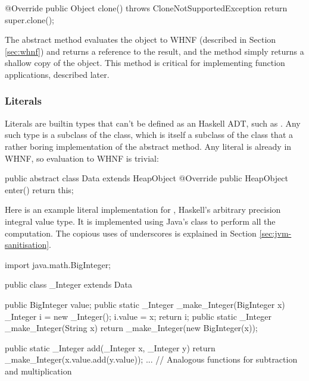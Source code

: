 \documentclass[dissertation.tex]{subfiles}
\begin{document}
{{\begin{javafigure}
{            @Override
            public Object clone() throws CloneNotSupportedException {
                return super.clone();
            }
        }
        \end{javafigure}

        The abstract  method evaluates the object to WHNF (described in Section \ref{sec:whnf}) and returns a reference to the result, and the  method simply returns a shallow copy of the object. This method is critical for implementing function applications, described later.

        \subsubsection{Literals}\label{sec:literals}
        {
            Literals are builtin types that can't be defined as an Haskell ADT, such as . Any such type is a subclass of the  class, which is itself a subclass of the  class that a rather boring implementation of the abstract  method. Any literal is already in WHNF, so evaluation to WHNF is trivial:

            \begin{javafigure}
            public abstract class Data extends HeapObject {
                @Override
                public HeapObject enter() {
                    return this;
                }
            }
            \end{javafigure}

            Here is an example literal implementation for , Haskell's arbitrary precision integral value type. It is implemented using Java's  class to perform all the computation. The copious uses of underscores is explained in Section \ref{sec:jvm-sanitisation}.

            \begin{javafigure}
            import java.math.BigInteger;

            public class _Integer extends Data {
                public BigInteger value;
                public static _Integer _make_Integer(BigInteger x) {
                    _Integer i = new _Integer();
                    i.value = x;
                    return i;
                }
                public static _Integer _make_Integer(String x) {
                    return _make_Integer(new BigInteger(x));
                }

                public static _Integer add(_Integer x, _Integer y) {
                    return _make_Integer(x.value.add(y.value));
                }
                ... // Analogous functions for subtraction and multiplication

}
\end{javafigure}}}}
\end{document}
